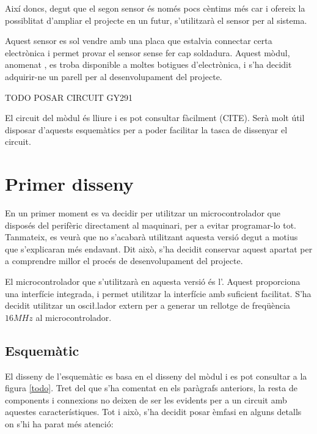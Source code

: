 Així doncs, degut que el segon sensor és només pocs cèntims més car i ofereix
la possiblitat d'ampliar el projecte en un futur, s'utilitzarà el sensor
 per al sistema.

Aquest sensor es sol vendre amb una placa que estalvia connectar
certa electrònica i permet provar el sensor sense fer cap soldadura.
Aquest mòdul, anomenat , es troba disponible a moltes botigues
d'electrònica, i s'ha decidit adquirir-ne un parell per al desenvolupament del
projecte.

TODO POSAR CIRCUIT GY291

El circuit del mòdul  és lliure i es pot consultar fàcilment (CITE).
Serà molt útil disposar d'aquests esquemàtics per a poder facilitar la tasca de
dissenyar el circuit.

\section{Primer disseny}

En un primer moment es va decidir per utilitzar un microcontrolador que disposés
del perifèric  directament al maquinari, per a evitar programar-lo tot.
Tanmateix, es veurà que no s'acabarà utilitzant aquesta versió degut a motius
que s'explicaran més endavant. Dit això, s'ha decidit conservar aquest apartat
per a comprendre millor el procés de desenvolupament del projecte.

El microcontrolador que s'utilitzarà en aquesta versió és l'.
Aquest proporciona una interfície  integrada, i permet utilitzar la
interfície  amb suficient facilitat. S'ha decidit utilitzar un
osci\l.lador extern per a generar un rellotge de freqüència $16MHz$
al microcontrolador.

\subsection{Esquemàtic}

El disseny de l'esquemàtic es basa en el disseny del mòdul  i es pot
consultar a la figura \ref{todo}. Tret del que s'ha comentat en els paràgrafs
anteriors, la resta de components i connexions no deixen de ser les evidents per
a un circuit amb aquestes característiques. Tot i això, s'ha decidit posar
èmfasi en alguns detalls on s'hi ha parat més atenció:

